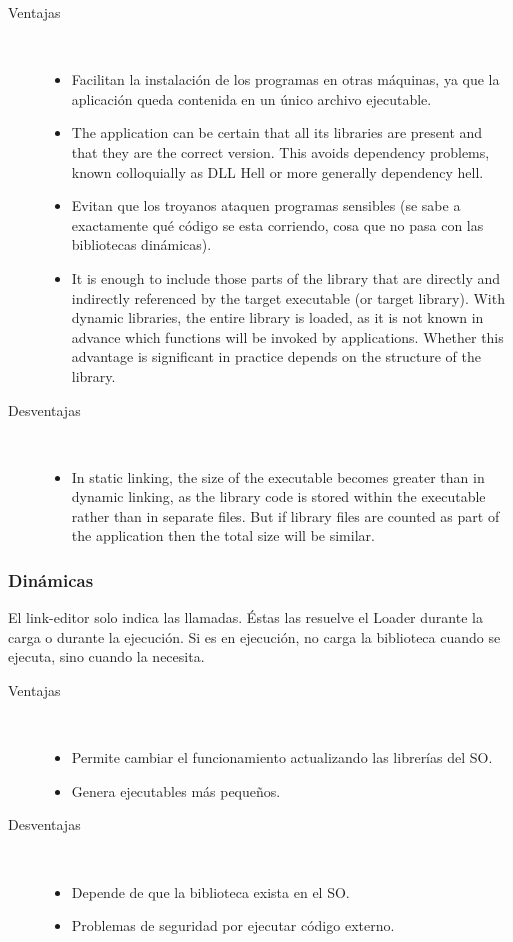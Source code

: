\documentclass[a4paper, twoside]{article}
\begin{document}
\begin{description}
	\item[Ventajas] ~
	\begin{itemize}
		\item Facilitan la instalación de los programas en otras máquinas, ya que la aplicación queda contenida en un único archivo ejecutable.
		\item The application can be certain that all its libraries are present and that they are the correct version. This avoids dependency problems, known colloquially as DLL Hell or more generally dependency hell.
		\item Evitan que los troyanos ataquen programas sensibles (se sabe a exactamente qué código se esta corriendo, cosa que no pasa con las bibliotecas dinámicas).
		\item It is enough to include those parts of the library that are directly and indirectly referenced by the target executable (or target library). With dynamic libraries, the entire library is loaded, as it is not known in advance which functions will be invoked by applications. Whether this advantage is significant in practice depends on the structure of the library.
	\end{itemize}

	\item[Desventajas] ~
	\begin{itemize}
		\item In static linking, the size of the executable becomes greater than in dynamic linking, as the library code is stored within the executable rather than in separate files. But if library files are counted as part of the application then the total size will be similar.
	\end{itemize}
\end{description}


\subsubsection{Dinámicas}
El link-editor solo indica las llamadas. Éstas las resuelve el Loader durante la carga o durante la ejecución. Si es en ejecución, no carga la biblioteca cuando se ejecuta, sino cuando la necesita.\\

\begin{description}
	\item[Ventajas] ~
	\begin{itemize}
		\item Permite cambiar el funcionamiento actualizando las librerías del SO.
		\item Genera ejecutables más pequeños.
	\end{itemize}

	\item[Desventajas] ~
	\begin{itemize}
		\item Depende de que la biblioteca exista en el SO.
		\item Problemas de seguridad por ejecutar código externo.
	\end{itemize}
\end{description}
\end{document}
